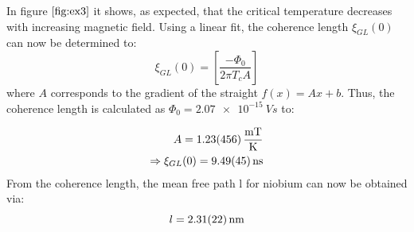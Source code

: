In figure $\autoref{fig:ex3}$ it shows, as expected, that the critical temperature decreases with increasing magnetic field. Using a linear fit, the coherence length $\xi_{GL}(0)$ can now be determined to:
\begin{equation}
    \xi_{GL}(0)= \left[ \frac{-\Phi_0}{2\pi T_cA} \right]
\end{equation}
where $A$ corresponds to the gradient of the straight $f(x) = Ax+b$.  Thus, the coherence length is calculated as $\Phi_0 = \SI{2.07e-15}{Vs} $ to:

\begin{align*}
    A = \SI{1,23\pm 4,56}{\frac{mT}{K}} \\
    \Rightarrow \xi_{GL}(0)= \SI{9,49\pm0,45}{ns} \\
\end{align*}
From the coherence length, the mean free path l for niobium can now be obtained via:
\begin{equation}
    l = \SI{2,31\pm0,22}{nm}
\end{equation}